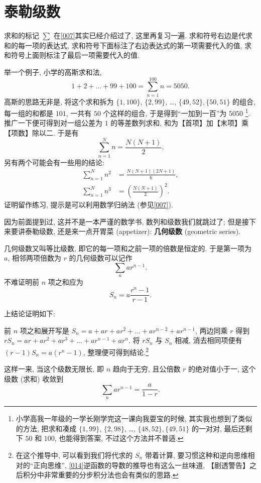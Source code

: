 \section{泰勒级数}\label{016}

\begin{tcolorbox}[size=fbox, breakable, enhanced jigsaw, title={求和 (summation) - 复习}]

求和的标记 $\sum$ 在\ref{007}其实已经介绍过了, 这里再复习一遍.
求和符号右边是代求和的每一项的表达式,
求和符号下面标注了右边表达式的第一项需要代入的值,
求和符号上面则标注了最后一项需要代入的值.

\begin{newquote}
举一个例子, 小学的高斯求和法,
\[
1+2+...+99+100=\sum_{n=1}^{100}n=5050.    
\]
高斯的思路无非是, 将这个求和拆为 $\{1,100\}$, $\{2,99\}$, \ldots,
$\{49,52\}$$, \{50,51\}$ 的组合, 每一组的和都是 $101$, 一共有
$50$ 个这样的组合, 于是得到``一加到一百''为 $5050$ \footnote{小学高我一年级的一学长刚学完这一课向我耍宝的时候,
  其实我也想到了类似的方法, 把求和凑成 $\{1,99\}$, $\{2,98\}$,
  \ldots, $\{48,52\}$$, \{49,51\}$ 的一对对, 最后还剩下 $50$ 和
  $100$, 也能得到答案, 不过这个方法并不普适.}.
推广一下便可得到对一组公差为 $1$ 的等差数列求和,
和为【首项】加【末项】乘【项数】除以二. 于是有 \[
\sum_{n=1}^Nn=\frac{N(N+1)}{2}.
\] 另有两个可能会有一些用的结论: \[
\begin{aligned}
  \sum_{n=1}^Nn^2&=\frac{N(N+1)(2N+1)}{6},\\
  \sum_{n=1}^Nn^3&=\left(\frac{N(N+1)}{2}\right)^2.
\end{aligned}
\] 证明留作练习, 提示是可以利用数学归纳法 (参见\ref{007}).
\end{newquote}

因为前面提到过, 这并不是一本严谨的数学书, 数列和级数我们就跳过了;
但是接下来要讲泰勒级数, 还是来一点开胃菜 (appetizer): \textbf{几何级数}
(geometric series).

几何级数又叫等比级数, 即它的每一项和之前一项的倍数是恒定的. 于是第一项为
$a$, 相邻两项倍数为 $r$ 的几何级数可以记作 \[
\sum_nar^{n-1}.
\] 不难证明前 $n$ 项之和应为 \[
S_n=a\frac{r^n-1}{r-1}.
\]

\begin{newquote}
上结论证明如下:

前 $n$ 项之和展开写是 $S_n=a+ar+ar^2+...+ar^{n-2}+ar^{n-1}$,
两边同乘 $r$ 得到 $rS_n=ar+ar^2+ar^3+...+ar^{n-1}+ar^n$. 将 $rS_n$
与 $S_n$ 相减, 消去相同项便有 $(r-1)S_n=a(r^n-1)$,
整理便可得到结论.\footnote{在这个推导中, 可以看到我们将代求的 $S_n$
  带着计算, 要习惯这种和逆向思维相对的``正向思维'',
  \ref{014}逆函数的导数的推导也有这么一丝味道,
  【剧透警告】之后积分中非常重要的分步积分法也会有类似的思路.}
\end{newquote}

这样一来, 当这个级数无限长, 即 $n$ 趋向于无穷, 且公倍数 $r$
的绝对值小于一, 这个级数 (求和) 收敛到 \[
\sum_nar^{n-1}=\frac{a}{1-r}.
\]

\end{tcolorbox}

